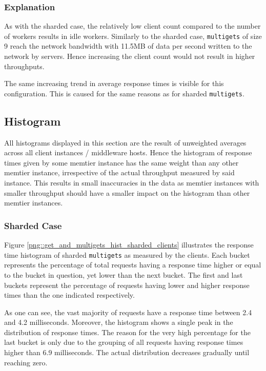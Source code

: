 \documentclass[11pt,a4paper]{article}
\begin{document}
\subsubsection{Explanation}
As with the sharded case, the relatively low client count compared to the number of workers results in idle workers. Similarly to the sharded case, \texttt{multigets} of size 9 reach the network bandwidth with 11.5MB of data per second written to the network by servers. Hence increasing the client count would not result in higher throughputs.

The same increasing trend in average response times is visible for this configuration. This is caused for the same reasons as for sharded \texttt{multigets}.

\subsection{Histogram}
All histograms displayed in this section are the result of unweighted averages across all client instances / middleware hosts. Hence the histogram of response times given by some memtier instance has the same weight than any other memtier instance, irrespective of the actual throughput measured by said instance. This results in small inaccuracies in the data as memtier instances with smaller throughput should have a smaller impact on the histogram than other memtier instances.

\subsubsection{Sharded Case}
Figure \ref{png::get_and_multigets_hist_sharded_clients} illustrates the response time histogram of sharded \texttt{multigets} as measured by the clients. Each bucket represents the percentage of total requests having a response time higher or equal to the bucket in question, yet lower than the next bucket. The first and last buckets represent the percentage of requests having lower and higher response times than the one indicated respectively.

As one can see, the vast majority of requests have a response time between 2.4 and 4.2 milliseconds. Moreover, the histogram shows a single peak in the distribution of response times. The reason for the very high percentage for the last bucket is only due to the grouping of all requests having response times higher than 6.9 milliseconds. The actual distribution decreases gradually until reaching zero.
\end{document}
